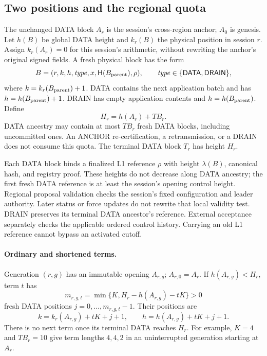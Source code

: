 \documentclass[11pt,a4paper]{article}
\newcommand{\Hash}{\mathsf H}
\newcommand{\tagg}[1]{\ensuremath{\mathsf{#1}}}
\begin{document}
\subsection{Two positions and the regional quota}
\label{sec:positions}
The unchanged DATA block $A_r$ is the session's cross-region anchor;
$A_0$ is genesis. Let $h(B)$ be global DATA height and $k_r(B)$ the
physical position in session $r$. Assign $k_r(A_r)=0$ for this session's
arithmetic, without rewriting the anchor's original signed fields.
A fresh physical block has the form
\[
 B=(r,k,h,\mathit{type},x,\Hash(B_{\rm parent}),\rho),
 \qquad \mathit{type}\in\{\tagg{DATA},\tagg{DRAIN}\},
\]
where $k=k_r(B_{\rm parent})+1$. DATA contains the next application batch
and has $h=h(B_{\rm parent})+1$. DRAIN has empty application contents
and $h=h(B_{\rm parent})$. Define
\[
 H_r=h(A_r)+TB_r.
\]
DATA ancestry may contain at most $TB_r$ fresh DATA blocks, including
uncommitted ones. An ANCHOR re-certification, a retransmission, or a DRAIN
does not consume this quota. The terminal DATA block $T_r$ has height $H_r$.

Each DATA block binds a finalized L1 reference $\rho$ with height
$\lambda(B)$, canonical hash, and registry proof. These heights do not
decrease along DATA ancestry; the first fresh DATA reference is at least
the session's opening control height. Regional proposal validation checks
the session's fixed configuration and leader authority. Later status or
force updates do not rewrite that local validity test.
DRAIN preserves its terminal DATA ancestor's reference.
External acceptance separately checks the applicable ordered control
history. Carrying an old L1 reference cannot bypass an activated cutoff.

\paragraph{Ordinary and shortened terms.}
Generation $(r,g)$ has an immutable opening $A_{r,g}$; $A_{r,0}=A_r$.
If $h(A_{r,g})<H_r$, term $t$ has
\[
 m_{r,g,t}=\min\{K,H_r-h(A_{r,g})-tK\}>0
\]
fresh DATA positions $j=0,\ldots,m_{r,g,t}-1$. Their positions are
\[
 k=k_r(A_{r,g})+tK+j+1,\qquad
 h=h(A_{r,g})+tK+j+1.
\]
There is no next term once its terminal DATA reaches $H_r$.
For example, $K=4$ and $TB_r=10$ give term lengths $4,4,2$ in an
uninterrupted generation starting at $A_r$.
\end{document}
